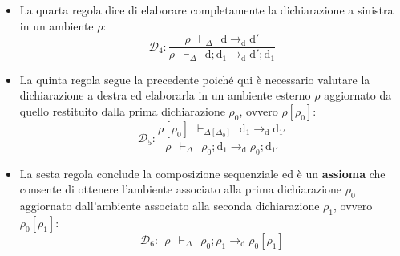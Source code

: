 \documentclass[a4paper]{article}
\begin{document}
	\begin{itemize}
		\item La quarta regola dice di elaborare completamente la dichiarazione a sinistra in un ambiente $\rho$:
		\begin{equation*}
			\mathcal{D}_{4}: \dfrac{
				\rho \:\: \vdash_{\Delta} \:\: \mathrm{d} \rightarrow_{\mathrm{d}} \mathrm{d}'
			}{
				\rho \:\: \vdash_{\Delta} \:\: \mathrm{d} ; \mathrm{d}_{1} \rightarrow_{\mathrm{d}} \mathrm{d}'; \mathrm{d}_{1}
			}
		\end{equation*}
		
		\item La quinta regola segue la precedente poiché qui è necessario valutare la dichiarazione a destra ed elaborarla in un ambiente esterno $\rho$ aggiornato da quello restituito dalla prima dichiarazione $\rho_{0}$, ovvero $\rho\left[\rho_{0}\right]$:
		\begin{equation*}
			\mathcal{D}_{5} : \dfrac{
				\rho\left[\rho_{0}\right] \:\: \vdash_{\Delta\left[\Delta_{0}\right]} \:\: \mathrm{d}_{1} \rightarrow_{\mathrm{d}} \mathrm{d}_{1'}
			}{
				\rho \:\: \vdash_{\Delta} \:\: \rho_{0} ; \mathrm{d}_{1} \rightarrow_{\mathrm{d}} \rho_{0} ; \mathrm{d}_{1'}
			}
		\end{equation*}
		
		\item La sesta regola conclude la composizione sequenziale ed è un \textbf{assioma} che consente di ottenere l'ambiente associato alla prima dichiarazione $\rho_{0}$ aggiornato dall'ambiente associato alla seconda dichiarazione $\rho_{1}$, ovvero $\rho_{0}\left[\rho_{1}\right]$:
		\begin{equation*}
			\mathcal{D}_{6} : \:\: \rho \:\: \vdash_{\Delta} \:\: \rho_{0} ; \rho_{1} \rightarrow_{\mathrm{d}} \rho_{0}\left[\rho_{1}\right]
		\end{equation*}
	\end{itemize}\newpage
	
\end{document}
